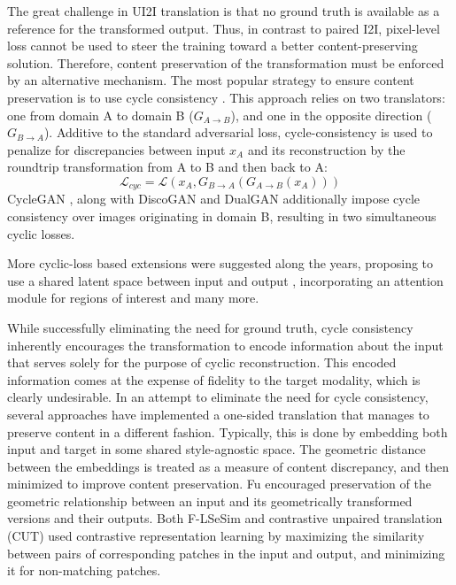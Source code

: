 The great challenge in UI2I translation is that no ground truth is available as a reference for the transformed output.
Thus, in contrast to paired I2I, pixel-level loss cannot be used to steer the training toward a better content-preserving solution.
Therefore, content preservation of the transformation must be enforced by an alternative mechanism.
The most popular strategy to ensure content preservation is to use cycle consistency \cite{Lee_2018_ECCV}.
This approach relies on two translators: one from domain A to domain B ($G_{A \rightarrow B}$), and one in the opposite direction ($G_{B \rightarrow A}$). 
Additive to the standard adversarial loss, cycle-consistency is used to penalize for discrepancies between input $x_A$ and its reconstruction by the roundtrip transformation from A to B and then back to A:
\begin{equation}
    \mathcal{L}_{cyc} = \mathcal{L}\left( x_A, G_{B \rightarrow A} \left( G_{A \rightarrow B}(x_A) \right) \right)
\end{equation}
CycleGAN \cite{CycleGAN2017}, along with DiscoGAN \cite{kim2017learning} and DualGAN \cite{yi2017dualgan} additionally impose cycle consistency over images originating in domain B, resulting in two simultaneous cyclic losses.

More cyclic-loss based extensions were suggested along the years, proposing to use a shared latent space between input and output \cite{liu2017unsupervised}, incorporating an attention module for regions of interest \cite{kim2019u} and many more.

While successfully eliminating the need for ground truth, cycle consistency inherently encourages the transformation to encode information about the input that serves solely for the purpose of cyclic reconstruction.
This encoded information comes at the expense of fidelity to the target modality, which is clearly undesirable.
In an attempt to eliminate the need for cycle consistency, several approaches have implemented a one-sided translation that manages to preserve content in a different fashion.
Typically, this is done by embedding both input and target in some shared style-agnostic space. 
The geometric distance between the embeddings is treated as a measure of content discrepancy, and then minimized to improve content preservation.
Fu \etal \cite{fu2019geometry} encouraged preservation of the geometric relationship between an input and its geometrically transformed versions and their outputs. 
Both F-LSeSim \cite{zheng2021spatially} and contrastive unpaired translation (CUT) \cite{park2020cut} used contrastive representation learning by maximizing the similarity between pairs of corresponding patches in the input and output, and minimizing it for non-matching patches.

